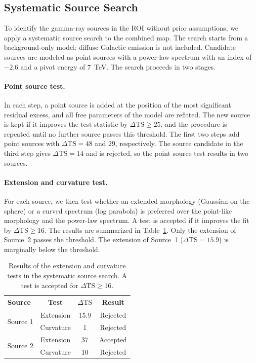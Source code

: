 \documentclass[10pt,letter]{article}
\begin{document}
\subsection{Systematic Source Search}
\label{sec:source_search}
To identify the gamma-ray sources in the ROI without prior assumptions, we apply a systematic source search to the combined map. The search starts from a background-only model; diffuse Galactic emission is not included. Candidate sources are modeled as point sources with a power-law spectrum with an index of $-2.6$ and a pivot energy of 7~TeV. The search proceeds in two stages.

\paragraph{Point source test.}
In each step, a point source is added at the position of the most significant residual excess, and all free parameters of the model are refitted. The new source is kept if it improves the test statistic by $\Delta\mathrm{TS} \geq 25$, and the procedure is repeated until no further source passes this threshold. The first two steps add point sources with $\Delta\mathrm{TS} = 48$ and 29, respectively. The source candidate in the third step gives $\Delta\mathrm{TS} = 14$ and is rejected, so the point source test results in two sources.

\paragraph{Extension and curvature test.}
For each source, we then test whether an extended morphology (Gaussian on the sphere) or a curved spectrum (log parabola) is preferred over the point-like morphology and the power-law spectrum. A test is accepted if it improves the fit by $\Delta\mathrm{TS} \geq 16$. The results are summarized in Table~\ref{tab:source_search_tests}. Only the extension of Source~2 passes the threshold. The extension of Source~1 ($\Delta\mathrm{TS} = 15.9$) is marginally below the threshold.

\begin{table}[H]
\centering
\caption{Results of the extension and curvature tests in the systematic source search. A test is accepted for $\Delta\mathrm{TS} \geq 16$.}
\label{tab:source_search_tests}
\renewcommand{\arraystretch}{1.2}
\begin{tabular}{l|c|c|c}
\hline
Source & Test & $\Delta\mathrm{TS}$ & Result \\
\hline
\multirow{2}{*}{Source 1} & Extension & 15.9 & Rejected \\
                          & Curvature & 1    & Rejected \\
\hline
\multirow{2}{*}{Source 2} & Extension & 37   & Accepted \\
                          & Curvature & 10   & Rejected \\
\hline
\end{tabular}
\end{table}
\end{document}
